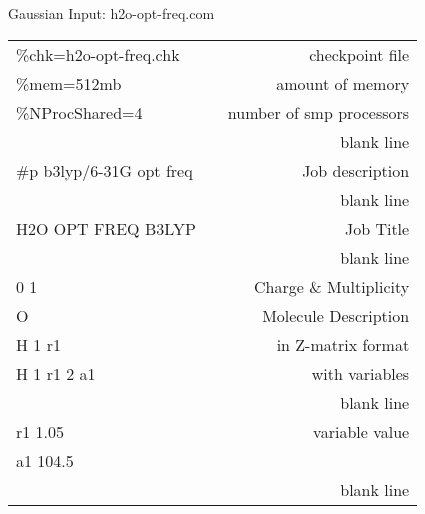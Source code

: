 \documentclass[slidestop,mathserif,compress,xcolor=svgnames]{beamer}
\newenvironment{eblock}[0]
{
\begin{beamerboxesrounded}[upper=uppercol2,lower=lowercol2,shadow=true]}
{\end{beamerboxesrounded}}
\begin{document}
\begin{frame}
  \begin{columns}
    \column{8.5cm}
    \vspace{-0.5cm}
    \begin{eblock}{Gaussian Input: h2o-opt-freq.com}
      \begin{tabular}{lcr}
	\%chk=h2o-opt-freq.chk   & & {\color{red}checkpoint file} \\
	\%mem=512mb              & & {\color{red}amount of memory} \\
	\%NProcShared=4          & & {\color{red}number of smp processors} \\
				 & & {\color{red}blank line} \\
	\#p b3lyp/6-31G opt freq & & {\color{red}Job description} \\
				 & & {\color{red}blank line} \\
	H2O OPT FREQ B3LYP       & & {\color{red}Job Title} \\
				 & & {\color{red}blank line} \\
	0 1                      & & {\color{red}Charge \& Multiplicity} \\
	O                        & & {\color{red}Molecule Description} \\
	H 1 r1                   & & {\color{red}in Z-matrix format} \\
	H 1 r1 2 a1              & & {\color{red}with variables} \\
				 & & {\color{red}blank line} \\
	r1 1.05                  & & {\color{red}variable value} \\
	a1 104.5                 & & {\color{red}} \\
				 & & {\color{red}blank line} \\
      \end{tabular}
    \end{eblock}
  \end{columns}
\end{frame}
\end{document}
